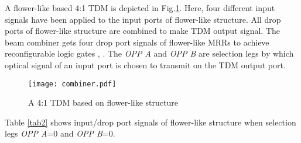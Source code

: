 \documentclass{osa-article}
\begin{document}
A flower-like based 4:1 TDM is depicted in Fig.\ref{fig2}. Here, four different input signals have been applied to the input ports of flower-like structure. All drop ports of flower-like structure are combined to make TDM output signal. The beam combiner gets four drop port signals of flower-like MRRs to achieve reconfigurable logic gates \cite{bloembergen1996nonlinear}, \cite{shen1984principles}. The \textit{OPP A} and \textit{OPP B} are selection legs by which optical signal of an input port is chosen to transmit on the TDM output port. 
\begin{figure}
\centering
	\texttt{[image: combiner.pdf]}
	\caption{A 4:1 TDM based on flower-like structure}
	\label{fig2}
\end{figure}
Table \ref{tab2} shows input/drop port signals of flower-like structure when selection legs \textit{OPP A}=0 and \textit{OPP B}=0.
\end{document}
